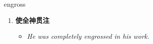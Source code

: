 
\begin{frame}
{\huge engross}
\begin{center}
\begin{enumerate}\Large
  \item \textbf{使全神贯注}
  \begin{itemize}
    \item \em{\Large{He was completely engrossed in his work.}}
  \end{itemize}
\end{enumerate}
\end{center}
\end{frame}
